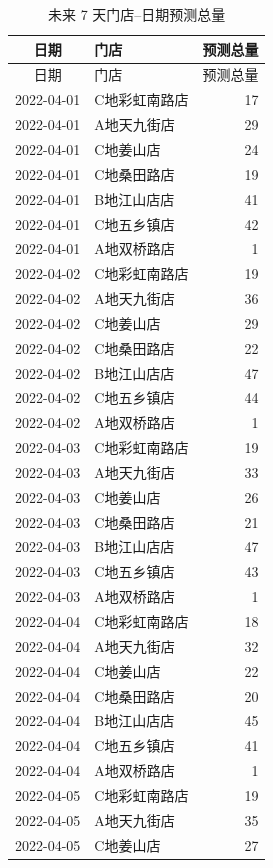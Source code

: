 \begingroup
\small
\begin{longtable}{clr}
\caption{未来 7 天门店--日期预测总量}\\
\toprule
日期 & 门店 & 预测总量 \\
\midrule
\endfirsthead
\toprule
日期 & 门店 & 预测总量 \\
\midrule
\endhead
2022-04-01 & C地彩虹南路店 & 17 \\
2022-04-01 & A地天九街店 & 29 \\
2022-04-01 & C地姜山店 & 24 \\
2022-04-01 & C地桑田路店 & 19 \\
2022-04-01 & B地江山店店 & 41 \\
2022-04-01 & C地五乡镇店 & 42 \\
2022-04-01 & A地双桥路店 & 1 \\
2022-04-02 & C地彩虹南路店 & 19 \\
2022-04-02 & A地天九街店 & 36 \\
2022-04-02 & C地姜山店 & 29 \\
2022-04-02 & C地桑田路店 & 22 \\
2022-04-02 & B地江山店店 & 47 \\
2022-04-02 & C地五乡镇店 & 44 \\
2022-04-02 & A地双桥路店 & 1 \\
2022-04-03 & C地彩虹南路店 & 19 \\
2022-04-03 & A地天九街店 & 33 \\
2022-04-03 & C地姜山店 & 26 \\
2022-04-03 & C地桑田路店 & 21 \\
2022-04-03 & B地江山店店 & 47 \\
2022-04-03 & C地五乡镇店 & 43 \\
2022-04-03 & A地双桥路店 & 1 \\
2022-04-04 & C地彩虹南路店 & 18 \\
2022-04-04 & A地天九街店 & 32 \\
2022-04-04 & C地姜山店 & 22 \\
2022-04-04 & C地桑田路店 & 20 \\
2022-04-04 & B地江山店店 & 45 \\
2022-04-04 & C地五乡镇店 & 41 \\
2022-04-04 & A地双桥路店 & 1 \\
2022-04-05 & C地彩虹南路店 & 19 \\
2022-04-05 & A地天九街店 & 35 \\
2022-04-05 & C地姜山店 & 27 \\

\end{longtable}
